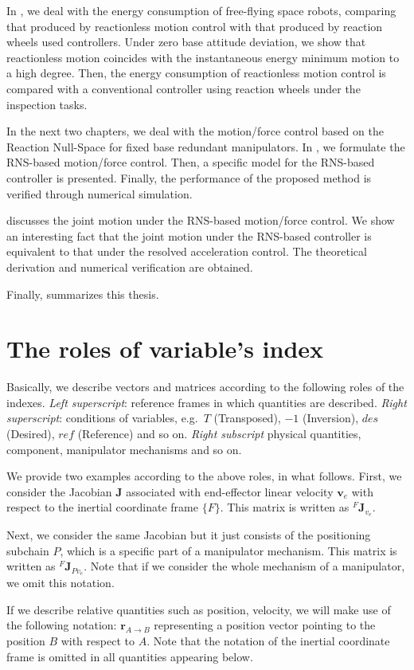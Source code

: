 In , we deal with the energy consumption of free-flying space robots,
comparing that produced by reactionless motion control with that produced by reaction wheels used controllers.
Under zero base attitude deviation,
we show that reactionless motion coincides with the instantaneous energy minimum motion to a high degree.
Then, the energy consumption of reactionless motion control is compared
with a conventional controller using reaction wheels under the inspection tasks.

In the next two chapters,
we deal with the motion/force control based on the Reaction Null-Space for fixed base redundant manipulators.
In ,
we formulate the RNS-based motion/force control.
Then, a specific model for the RNS-based controller is presented.
Finally, the performance of the proposed method is verified through numerical simulation.

 discusses the joint motion under the RNS-based motion/force control.
We show an interesting fact that the joint motion under the RNS-based controller
is equivalent to that under the resolved acceleration control.
The theoretical derivation and numerical verification are obtained.

Finally,  summarizes this thesis.

\section{The roles of variable's index}
Basically, we describe vectors and matrices according to the following roles of the indexes.
\textit{Left superscript}: reference frames in which quantities are described.
\textit{Right superscript}: conditions of variables,
  e.g.\ $T$ (Transposed), $-1$ (Inversion), $des$ (Desired), $ref$ (Reference) and so on.
\textit{Right subscript} physical quantities, component, manipulator mechanisms and so on.

We provide two examples according to the above roles, in what follows.
First, we consider the Jacobian $\bm{J}$ associated with end-effector linear velocity $\bm{v}_{e}$
with respect to the inertial coordinate frame $\{F\}$.
This matrix is written as ${}^{F}\bm{J}_{v_{e}}$.

Next, we consider the same Jacobian but it just consists of the positioning subchain $P$,
which is a specific part of a manipulator mechanism.
This matrix is written as ${}^{F}\bm{J}_{Pv_{e}}$.
Note that if we consider the whole mechanism of a manipulator,
we omit this notation.

If we describe relative quantities such as position, velocity,
we will make use of the following notation:
$\bm{r}_{A \rightarrow B}$ representing a position vector pointing to the position $B$
with respect to $A$.
Note that the notation of the inertial coordinate frame is omitted in all quantities appearing below.



%
%
